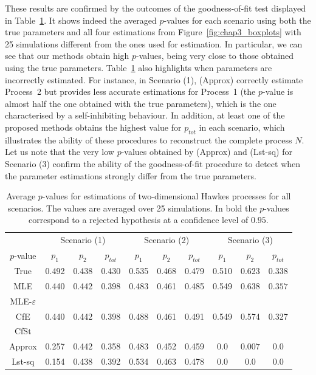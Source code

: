     These results are confirmed by the outcomes of the goodness-of-fit test displayed in Table~\ref{tab:chap3_p_values_2}.
    It shows indeed the averaged $p$-values for each scenario using both the true parameters and all four estimations from Figure~\ref{fig:chap3_boxplots} with 25 simulations different from the ones used for estimation. In particular, we can see that our methods obtain high $p$-values, being very close to those obtained using the true parameters.
    Table~\ref{tab:chap3_p_values_2} also highlights when parameters are incorrectly estimated.
    For instance, in Scenario (1), (Approx) correctly estimate Process~2 but provides less accurate estimations for Process~1 (the \(p\)-value is almost half the one obtained with the true parameters), which is the one characterised by a self-inhibiting behaviour.
    In addition, at least one of the proposed methods obtains the highest value for $p_{tot}$ in each scenario, which illustrates the ability of these procedures to reconstruct the complete process $N$.
    Let us note that the very low \(p\)-values obtained by (Approx) and (Lst-sq) for Scenario (3) confirm the ability of the goodness-of-fit procedure to detect when the parameter estimations strongly differ from the true parameters.
    
    \begin{table}[!ht]
    \begin{center}
    \centering
    \begin{tabular}{c|ccc|ccc|ccc}
          & \multicolumn{3}{c|}{Scenario (1)}& \multicolumn{3}{c|}{Scenario (2)}& \multicolumn{3}{c}{Scenario (3)} \\
         $p$-value & $p_1$ & $p_2$ & $p_{tot}$ & $p_1$ & $p_2$ & $p_{tot}$ & $p_1$ & $p_2$ & $p_{tot}$\\
         \toprule
         True & 0.492 & 0.438 & 0.430 & 0.535 & 0.468 & 0.479 & 0.510 & 0.623 & 0.338\\
         \midrule
         MLE &  0.440 & 0.442  & 0.398  & 0.483  & 0.461  & 0.485 & 0.549  & 0.638 & $0.357$\\
         \midrule
         MLE-$\varepsilon$ & \multirow{3}{*}{0.440} & \multirow{3}{*}{0.442} &  \multirow{3}{*}{0.398} & \multirow{3}{*}{0.488}  & \multirow{3}{*}{0.461} & \multirow{3}{*}{0.491} & \multirow{3}{*}{0.549} & \multirow{3}{*}{0.574}  & \multirow{3}{*}{0.327}  \\
         CfE &  &  &  &  &  &  &  &  &  \\
         CfSt &  &  &  &  &  &  &  &  &  \\
         \midrule
         Approx & 0.257 & 0.442 & 0.358 & 0.483 & 0.452 & 0.459 & $\mathbf{0.0}$ & $\mathbf{0.007}$ & $\mathbf{0.0}$ \\
         Lst-sq & 0.154 & 0.438 & 0.392 & 0.534 & 0.463 & 0.478 & $\mathbf{0.0}$ & $\mathbf{0.0}$ & $\mathbf{0.0}$
    \end{tabular}
    \caption{Average $p$-values for estimations of two-dimensional Hawkes processes for all scenarios. The values are averaged over 25 simulations. In bold the $p$-values correspond to a rejected hypothesis at a confidence level of $0.95$.}
    \label{tab:chap3_p_values_2}
    \end{center}
    \end{table}

